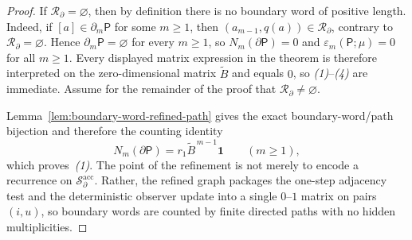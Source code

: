\documentclass{etds}%
\numberwithin{equation}{section}
\theoremstyle{plain}
\theoremstyle{definition}
\theoremstyle{remark}
\begin{document}
\begin{proof}
If $\mathcal{R}_\partial=\varnothing$, then by definition there is no boundary
word of positive length.  Indeed, if $[a]\in\partial_m\mathsf{P}$ for some
$m\ge 1$, then $(a_{m-1},q(a))\in\mathcal{R}_\partial$, contrary to
$\mathcal{R}_\partial=\varnothing$.  Hence $\partial_m\mathsf{P}=\varnothing$
for every $m\ge 1$, so $N_m(\partial\mathsf{P})=0$ and
$\varepsilon_m(\mathsf{P};\mu)=0$ for all $m\ge 1$.  Every displayed matrix
expression in the theorem is therefore interpreted on the zero-dimensional
matrix $\widetilde{B}$ and equals $0$, so \emph{(1)}--\emph{(4)} are immediate.
Assume for the remainder of the proof that
$\mathcal{R}_\partial\neq\varnothing$.

Lemma~\ref{lem:boundary-word-refined-path} gives the exact boundary-word/path
bijection and therefore the counting identity
\[
N_m(\partial\mathsf{P})=r_1\widetilde{B}^{\,m-1}\mathbf{1}
\qquad(m\ge 1),
\]
which proves~\emph{(1)}.  The point of the refinement is not merely to encode a
recurrence on $\mathcal{S}_\partial^{\mathrm{acc}}$.  Rather, the refined graph
packages the one-step adjacency test and the deterministic observer update into
a single $0$--$1$ matrix on pairs $(i,u)$, so boundary words are counted by
finite directed paths with no hidden multiplicities.


\end{proof}
\end{document}
